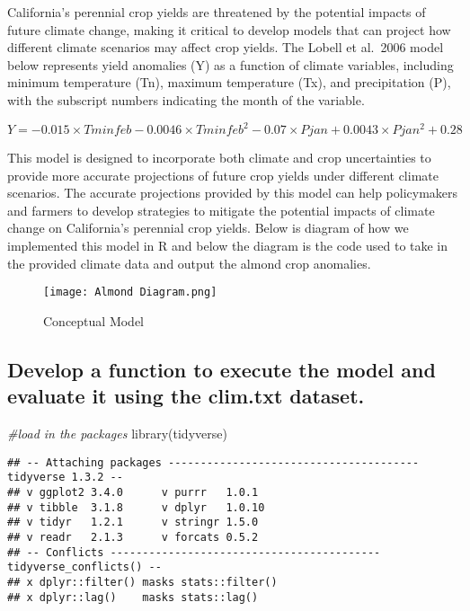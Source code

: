 \documentclass[
]{article}
\newenvironment{Shaded}{\begin{snugshade}}{\end{snugshade}}
\newcommand{\CommentTok}[1]{\textcolor[rgb]{0.56,0.35,0.01}{\textit{#1}}}
\newcommand{\FunctionTok}[1]{\textcolor[rgb]{0.00,0.00,0.00}{#1}}
\newcommand{\NormalTok}[1]{#1}
\begin{document}
California's perennial crop yields are threatened by the potential
impacts of future climate change, making it critical to develop models
that can project how different climate scenarios may affect crop yields.
The Lobell et al.~2006 model below represents yield anomalies (Y) as a
function of climate variables, including minimum temperature (Tn),
maximum temperature (Tx), and precipitation (P), with the subscript
numbers indicating the month of the variable.

\[Y=−0.015×Tminfeb​​−0.0046×Tminfeb^2​−0.07×Pjan​+0.0043×Pjan^2​+0.28\]

This model is designed to incorporate both climate and crop
uncertainties to provide more accurate projections of future crop yields
under different climate scenarios. The accurate projections provided by
this model can help policymakers and farmers to develop strategies to
mitigate the potential impacts of climate change on California's
perennial crop yields. Below is diagram of how we implemented this model
in R and below the diagram is the code used to take in the provided
climate data and output the almond crop anomalies.

\begin{figure}
\centering
\texttt{[image: Almond Diagram.png]}
\caption{Conceptual Model}
\end{figure}

\hypertarget{develop-a-function-to-execute-the-model-and-evaluate-it-using-the-clim.txt-dataset.}{%
\subsection{Develop a function to execute the model and evaluate it
using the clim.txt
dataset.}\label{develop-a-function-to-execute-the-model-and-evaluate-it-using-the-clim.txt-dataset.}}

\begin{Shaded}
\begin{Highlighting}[]
\CommentTok{\#load in the packages}
\FunctionTok{library}\NormalTok{(tidyverse)}
\end{Highlighting}
\end{Shaded}

\begin{verbatim}
## -- Attaching packages --------------------------------------- tidyverse 1.3.2 --
## v ggplot2 3.4.0      v purrr   1.0.1 
## v tibble  3.1.8      v dplyr   1.0.10
## v tidyr   1.2.1      v stringr 1.5.0 
## v readr   2.1.3      v forcats 0.5.2 
## -- Conflicts ------------------------------------------ tidyverse_conflicts() --
## x dplyr::filter() masks stats::filter()
## x dplyr::lag()    masks stats::lag()
\end{verbatim}
\end{document}
